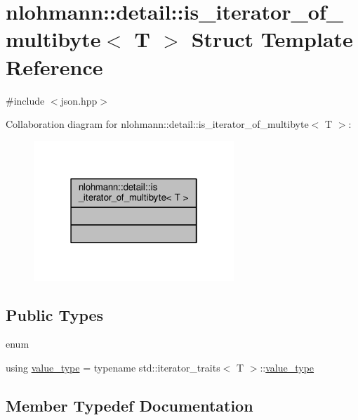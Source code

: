 \hypertarget{structnlohmann_1_1detail_1_1is__iterator__of__multibyte}{}\section{nlohmann\+:\+:detail\+:\+:is\+\_\+iterator\+\_\+of\+\_\+multibyte$<$ T $>$ Struct Template Reference}
\label{structnlohmann_1_1detail_1_1is__iterator__of__multibyte}


{\ttfamily \#include $<$json.\+hpp$>$}



Collaboration diagram for nlohmann\+:\+:detail\+:\+:is\+\_\+iterator\+\_\+of\+\_\+multibyte$<$ T $>$\+:
\nopagebreak
\begin{figure}[H]
\begin{center}
\leavevmode
\includegraphics[width=214pt]{structnlohmann_1_1detail_1_1is__iterator__of__multibyte__coll__graph}
\end{center}
\end{figure}
\subsection*{Public Types}
\begin{DoxyCompactItemize}
\item 
enum 
\item 
using \hyperlink{structnlohmann_1_1detail_1_1is__iterator__of__multibyte_a830339a3ad86d82d32a67f9c180523b1}{value\+\_\+type} = typename std\+::iterator\+\_\+traits$<$ T $>$\+::\hyperlink{structnlohmann_1_1detail_1_1is__iterator__of__multibyte_a830339a3ad86d82d32a67f9c180523b1}{value\+\_\+type}
\end{DoxyCompactItemize}


\subsection{Member Typedef Documentation}
